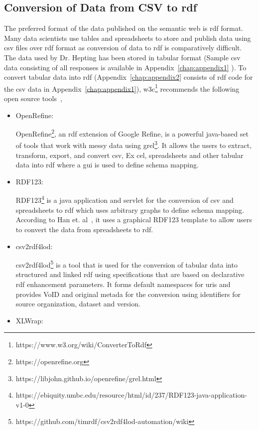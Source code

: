 \begin{doublespace}
\section{Conversion of Data from CSV to \ac{rdf}}
\par The preferred format of the data published on the semantic web is \ac{rdf} format. Many data scientists use tables and spreadsheets to store and publish data using \ac{csv} files over \ac{rdf} format as conversion of data to \ac{rdf} is comparatively difficult. The data used by Dr. Hepting has been stored in tabular format (Sample \ac{csv} data consisting of all responses is available in Appendix~\ref{chap:appendix1} ). To convert tabular data into \ac{rdf} (Appendix~\ref{chap:appendix2} consists of \ac{rdf} code for the \ac{csv} data in Appendix~\ref{chap:appendix1}), \ac{w3c}\footnote{https://www.w3.org/wiki/ConverterToRdf} recommends the following open source tools~\cite{ermilov2013csv},
\begin{itemize}
    \item OpenRefine:
    \par OpenRefine\footnote{https://openrefine.org}, an \ac{rdf} extension of Google Refine, is a powerful java-based set of tools that work with messy data using \ac{grel}\footnote{https://libjohn.github.io/openrefine/grel.html}. It allows the users to extract, transform, export, and convert \ac{csv}, Ex cel, spreadsheets and other tabular data into \ac{rdf} where a \ac{gui} is used to define schema mapping.
    \item RDF123:
    \par RDF123\footnote{https://ebiquity.umbc.edu/resource/html/id/237/RDF123-java-application-v1-0} is a java application and servlet for the conversion of \ac{csv} and spreadsheets to \ac{rdf} which uses arbitrary graphs to define schema mapping. According to Han et. al~\cite{han2008rdf}, it uses a graphical RDF123 template to allow users to convert the data from spreadsheets to \ac{rdf}.
    \item csv2rdf4lod:
    \par csv2rdf4lod\footnote{https://github.com/timrdf/csv2rdf4lod-automation/wiki} is a tool that is used for the conversion of tabular data into structured and linked \ac{rdf} using specifications that are based on declarative \ac{rdf} enhancement parameters. It forms default namespaces for \ac{uri}s and provides VoID and original metada for the conversion using identifiers for source organization, dataset and version.
    \item XLWrap:

\end{itemize}
\end{doublespace}
